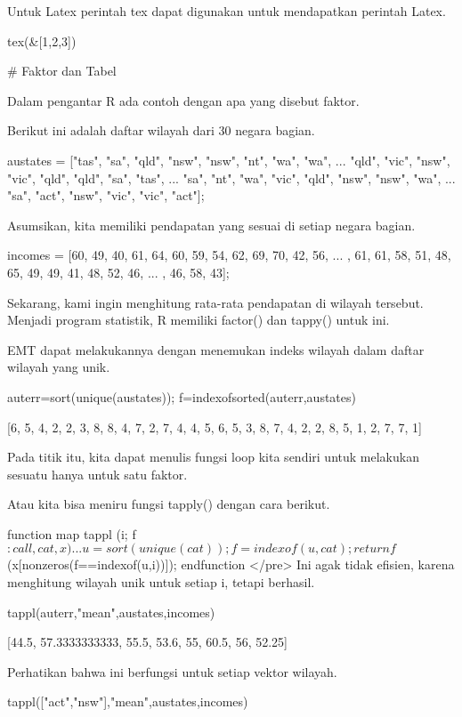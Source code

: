 \documentclass{article}
\begin{document}
Untuk Latex perintah tex dapat digunakan untuk mendapatkan perintah
Latex.


\>tex(&[1,2,3])


    \left[ 1 , 2 , 3 \right] 

# Faktor dan Tabel

Dalam pengantar R ada contoh dengan apa yang disebut faktor.


Berikut ini adalah daftar wilayah dari 30 negara bagian.


\>austates = ["tas", "sa", "qld", "nsw", "nsw", "nt", "wa", "wa", ...  
\>   "qld", "vic", "nsw", "vic", "qld", "qld", "sa", "tas", ...  
\>   "sa", "nt", "wa", "vic", "qld", "nsw", "nsw", "wa", ...  
\>   "sa", "act", "nsw", "vic", "vic", "act"];


Asumsikan, kita memiliki pendapatan yang sesuai di setiap negara
bagian.


\>incomes = [60, 49, 40, 61, 64, 60, 59, 54, 62, 69, 70, 42, 56, ...  
, 61, 61, 58, 51, 48, 65, 49, 49, 41, 48, 52, 46, ...  
, 46, 58, 43];


Sekarang, kami ingin menghitung rata-rata pendapatan di wilayah
tersebut. Menjadi program statistik, R memiliki factor() dan tappy()
untuk ini.


EMT dapat melakukannya dengan menemukan indeks wilayah dalam daftar
wilayah yang unik.


\>auterr=sort(unique(austates)); f=indexofsorted(auterr,austates)


    [6,  5,  4,  2,  2,  3,  8,  8,  4,  7,  2,  7,  4,  4,  5,  6,  5,  3,
    8,  7,  4,  2,  2,  8,  5,  1,  2,  7,  7,  1]

Pada titik itu, kita dapat menulis fungsi loop kita sendiri untuk
melakukan sesuatu hanya untuk satu faktor.


Atau kita bisa meniru fungsi tapply() dengan cara berikut.


\>function map tappl (i; f$:call, cat, x) ...


    u=sort(unique(cat));
    f=indexof(u,cat);
    return f$(x[nonzeros(f==indexof(u,i))]);
    endfunction
</pre>
Ini agak tidak efisien, karena menghitung wilayah unik untuk setiap i,
tetapi berhasil.


\>tappl(auterr,"mean",austates,incomes)


    [44.5,  57.3333333333,  55.5,  53.6,  55,  60.5,  56,  52.25]

Perhatikan bahwa ini berfungsi untuk setiap vektor wilayah.


\>tappl(["act","nsw"],"mean",austates,incomes)
\end{document}
